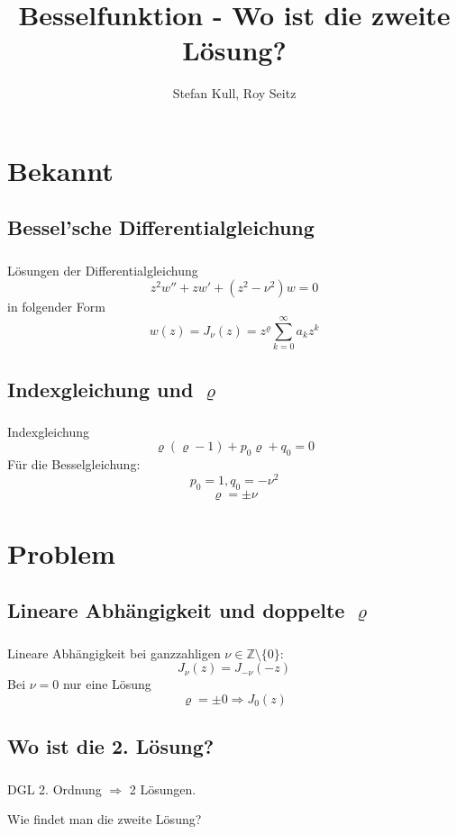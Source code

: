 \documentclass{beamer}
\author{Stefan Kull, Roy Seitz}
\title{Besselfunktion - Wo ist die zweite Lösung?}
\newenvironment{slide}
{\begin{frame}[environment=slide]
	\frametitle{\insertsection}
	\framesubtitle{\insertsubsection}}
{\end{frame}}
\begin{document}
	
	\begin{frame}
		\titlepage
	\end{frame}
	
	\begin{frame}
		\tableofcontents
	\end{frame}
	
\section{Bekannt}	
\subsection{Bessel'sche Differentialgleichung}	
	\begin{slide}
		Lösungen der Differentialgleichung
		$$ z^2w''+zw'+(z^2-\nu^2)w=0 $$
		in folgender Form
		$$
		w(z)=J_\nu(z)=z^\varrho\sum_{k=0}^{\infty}a_kz^k 
		$$
	\end{slide}
	
\subsection{Indexgleichung und $\varrho$}
	\begin{slide}
		Indexgleichung
		$$\varrho(\varrho-1)+p_0\varrho+q_0=0$$
		Für die Besselgleichung:
		$$p_0=1, q_0=-\nu^2$$
		$$\varrho=\pm\nu $$
	\end{slide}

\section{Problem}
\subsection{Lineare Abhängigkeit und doppelte $\varrho$}
	\begin{slide}
		Lineare Abhängigkeit bei ganzzahligen $\nu\in\mathbb{Z}\setminus\{0\}$:
		$$J_\nu(z) = J_{-\nu}(-z)$$
		Bei $\nu=0$ nur eine Lösung
		$$\varrho=\pm 0\Rightarrow J_0(z)$$
	\end{slide}
	
\subsection{Wo ist die 2. Lösung?}
	\begin{slide}		
		DGL 2. Ordnung $\Rightarrow$ 2 Lösungen.
		
		Wie findet man die zweite Lösung?
		
	\end{slide}
	
\end{document}
